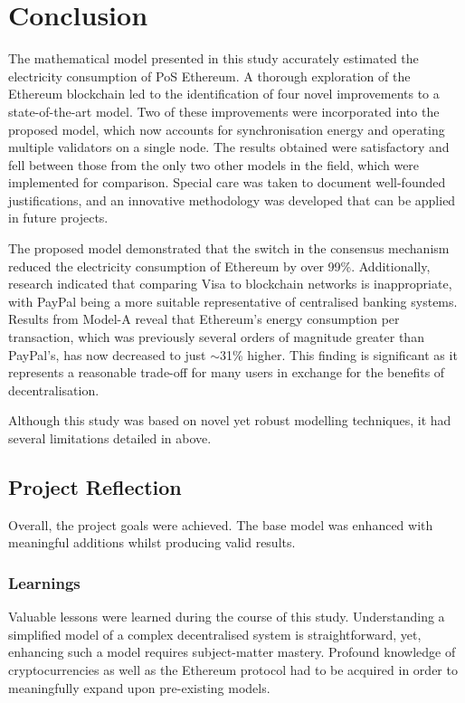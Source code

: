 \chapter{Conclusion}

The mathematical model presented in this study accurately estimated the electricity consumption of PoS Ethereum. A thorough exploration of the Ethereum blockchain led to the identification of four novel improvements to a state-of-the-art model. Two of these improvements were incorporated into the proposed model, which now accounts for synchronisation energy and operating multiple validators on a single node. The results obtained were satisfactory and fell between those from the only two other models in the field, which were implemented for comparison. Special care was taken to document well-founded justifications, and an innovative methodology was developed that can be applied in future projects. 

The proposed model demonstrated that the switch in the consensus mechanism reduced the electricity consumption of Ethereum by over 99\%. Additionally, research indicated that comparing Visa to blockchain networks is inappropriate, with PayPal being a more suitable representative of centralised banking systems. Results from Model-A reveal that Ethereum's energy consumption per transaction, which was previously several orders of magnitude greater than PayPal's, has now decreased to just $\sim$31\% higher. This finding is significant as it represents a reasonable trade-off for many users in exchange for the benefits of decentralisation.  

Although this study was based on novel yet robust modelling techniques, it had several limitations detailed in  above.


\section{Project Reflection}

Overall, the project goals were achieved. The base model was enhanced with meaningful additions whilst producing valid results.

\subsection{Learnings}

Valuable lessons were learned during the course of this study. Understanding a simplified model of a complex decentralised system is straightforward, yet, enhancing such a  model requires subject-matter mastery. Profound knowledge of cryptocurrencies as well as the Ethereum protocol had to be acquired in order to meaningfully expand upon pre-existing models.

